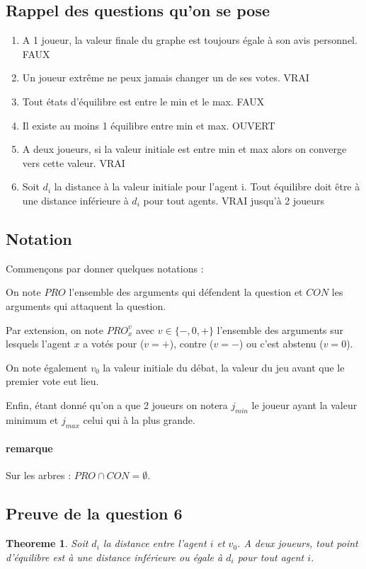 \documentclass[12pt]{article}
\newtheorem{theoreme}{Theoreme}[section]
\theoremstyle{defi}
\theoremstyle{not}
\theoremstyle{prob}
\begin{document}
    \subsection{Rappel des questions qu'on se pose}
      \begin{enumerate}
        \item A 1 joueur, la valeur finale du graphe est toujours égale à son avis personnel. FAUX
        \item Un joueur extrême ne peux jamais changer un de ses votes. VRAI
        \item Tout états d'équilibre est entre le min et le max. FAUX
        \item Il existe au moins 1 équilibre entre min et max. OUVERT
        \item A deux joueurs, si la valeur initiale est entre min et max alors on converge vers cette valeur. VRAI
        \item Soit $d_i$ la distance à la valeur initiale pour l'agent i. Tout équilibre doit être à une distance inférieure à $d_i$ pour tout agents. VRAI jusqu'à 2 joueurs
      \end{enumerate}

    \subsection{Notation}
      Commençons par donner quelques notations :

      On note $PRO$ l'ensemble des arguments qui défendent la question et $CON$ les arguments qui attaquent la question.

      Par extension, on note $PRO^v_x$ avec $v \in \{-, 0, +\}$ l'ensemble des arguments sur lesquels l'agent $x$ a votés pour ($v = +$), contre ($v = -$) ou c'est abstenu ($v = 0$).

      On note également $v_0$ la valeur initiale du débat, la valeur du jeu avant que le premier vote eut lieu.

      Enfin, étant donné qu'on a que 2 joueurs on notera $j_{min}$ le joueur ayant la valeur minimum et $j_{max}$ celui qui à la plus grande.

      \paragraph{remarque} Sur les arbres : $PRO \cap CON = \emptyset$.


    \subsection{Preuve de la question 6}
    \begin{theoreme}
    \label{thm:question_6}
      Soit $d_i$ la distance entre l'agent $i$ et $v_0$. A deux joueurs, tout point d'équilibre est à une distance inférieure ou égale à $d_i$ pour tout agent $i$.
    \end{theoreme}
\end{document}
